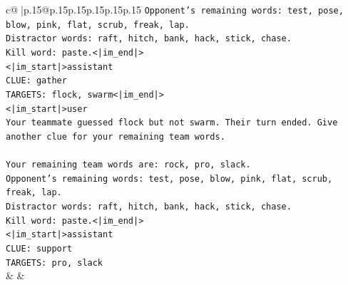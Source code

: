 \documentclass{article}
\begin{document}
{\begin{supertabular}{c@{$\;$}|p{.15\linewidth}@{}p{.15\linewidth}p{.15\linewidth}p{.15\linewidth}p{.15\linewidth}p{.15\linewidth}}
{{{\texttt{Opponent's remaining words: test, pose, blow, pink, flat, scrub, freak, lap.} \\
\texttt{Distractor words: raft, hitch, bank, hack, stick, chase.} \\
\texttt{Kill word: paste.<|im\_end|>} \\
\texttt{<|im\_start|>assistant} \\
\texttt{CLUE: gather} \\
\texttt{TARGETS: flock, swarm<|im\_end|>} \\
\texttt{<|im\_start|>user} \\
\texttt{Your teammate guessed flock but not swarm. Their turn ended. Give another clue for your remaining team words.} \\
\\ 
\texttt{Your remaining team words are: rock, pro, slack.} \\
\texttt{Opponent's remaining words: test, pose, blow, pink, flat, scrub, freak, lap.} \\
\texttt{Distractor words: raft, hitch, bank, hack, stick, chase.} \\
\texttt{Kill word: paste.<|im\_end|>} \\
\texttt{<|im\_start|>assistant} \\
\texttt{CLUE: support} \\
\texttt{TARGETS: pro, slack} \\
            }
        }
    }
    & & \\ \\


\end{supertabular}}
\end{document}
